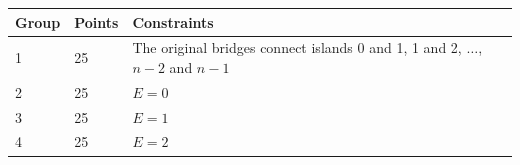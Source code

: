 \noindent
\begin{tabular}{| l | l | l |}
\hline
Group & Points & Constraints \\ \hline
	1     & 25         & The original bridges connect islands 0 and 1, 1 and 2, $\dots$, $n - 2$ and $n - 1$\\ \hline
	2     & 25         & $E = 0$ \\ \hline
	3     & 25         & $E = 1$ \\ \hline
	4     & 25         & $E = 2$ \\ \hline
\end{tabular}
